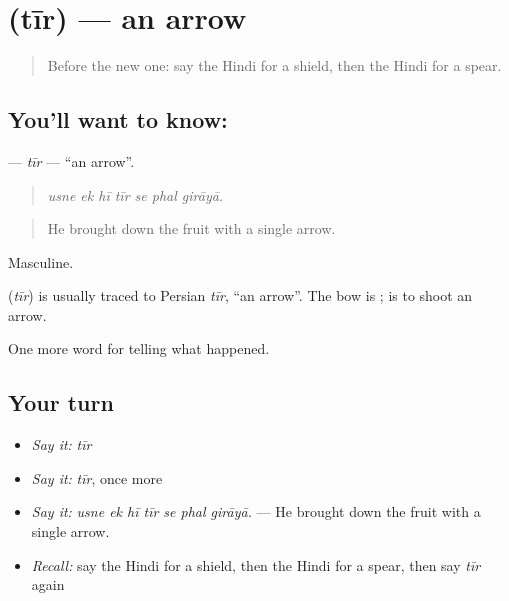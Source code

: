 \section[\texorpdfstring{\hi{तीर} (tīr)}{तीर (tīr)}]{ (tīr) — an arrow}

\label{lesson:HI-C322-tir}



\begin{quote}
Before the new one: say the Hindi for a shield, then the Hindi for a spear.
\end{quote}

\subsection*{You'll want to know: }
\textbf{} — \emph{tīr} — \textquotedblleft{}an arrow\textquotedblright{}.

\begin{quote}
      
\end{quote}

\begin{quote}
\emph{usne ek hī tīr se phal girāyā.}
\end{quote}

\begin{quote}
He brought down the fruit with a single arrow.
\end{quote}

Masculine.

\begin{cousinweb}
\textbf{} (\emph{tīr}) is usually traced to Persian \emph{tīr}, \textquotedblleft{}an arrow\textquotedblright{}. The bow is \textbf{}; \textbf{ } is to shoot an arrow.
\end{cousinweb}

\begin{grammarlens}[title={What you've built}]
One more word for telling what happened.
\end{grammarlens}

\subsection*{Your turn}
\begin{itemize}
\raggedright
  \item \emph{Say it:} \emph{tīr}
  \item \emph{Say it:} \emph{tīr}, once more
  \item \emph{Say it:} \emph{usne ek hī tīr se phal girāyā.} — He brought down the fruit with a single arrow.
  \item \emph{Recall:} say the Hindi for a shield, then the Hindi for a spear, then say \emph{tīr} again
\end{itemize}


